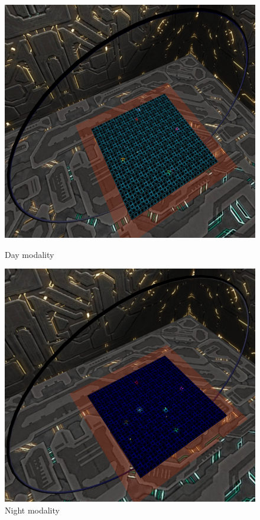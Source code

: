\documentclass[11pt]{article}
\begin{document}
\begin{figure}
	\centering
	\begin{minipage}[b]{0.45\linewidth}
		\includegraphics[width=\linewidth]{giorno}
		\caption{Day modality}
	\end{minipage}
	\hfill
	\begin{minipage}[b]{0.45\linewidth}
		\includegraphics[width=\linewidth]{notte}
		\caption{Night modality}
	\end{minipage}
\end{figure}
\end{document}
